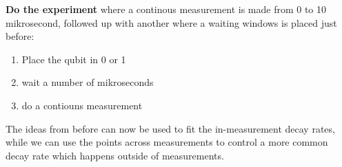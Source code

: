 \textbf{Do the experiment} where a continous measurement is made from 0 to 10 mikrosecond, followed up with another where a waiting windows is placed just before:
\begin{enumerate}
    \item Place the qubit in 0 or 1
    \item wait a number of mikroseconds
    \item do a contiouns measurement
\end{enumerate}
The ideas from before can now be used to fit the in-measurement decay rates, while we can use the points across measurements to control a more common decay rate which happens outside of measurements.